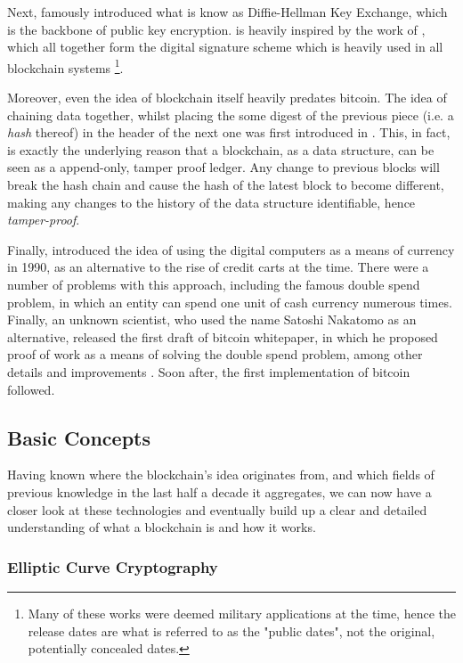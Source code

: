 Next, \cite{Diffie_Hellman_1976} famously introduced what is know as Diffie-Hellman Key Exchange,
which is the backbone of public key encryption. \cite{Diffie_Hellman_1976} is heavily inspired by
the work of \cite{Merkle_1978}, which all together form the digital signature scheme which is
heavily used in all blockchain systems \footnote{Many of these works were deemed military
applications at the time, hence the release dates are what is referred to as the "public dates", not
the original, potentially concealed dates.}.

Moreover, even the idea of blockchain itself heavily predates bitcoin. The idea of chaining data
together, whilst placing the some digest of the previous piece (i.e. a \textit{hash} thereof) in the
header of the next one was first introduced in \cite{Timestamping_1991}. This, in fact, is exactly
the underlying reason that a blockchain, as a data structure, can be seen as a append-only, tamper
proof ledger. Any change to previous blocks will break the hash chain and cause the hash of the
latest block to become different, making any changes to the history of the data structure
identifiable, hence \textit{tamper-proof}.

Finally, \cite{Chaum_Fiat_Naor_1990} introduced the idea of using the digital computers as a means
of currency in 1990, as an alternative to the rise of credit carts at the time. There were a number
of problems with this approach, including the famous double spend problem, in which an entity can
spend one unit of cash currency numerous times. Finally, an unknown scientist, who used the name
Satoshi Nakatomo as an alternative, released the first draft of bitcoin whitepaper, in which he
proposed proof of work as a means of solving the double spend problem, among other details and
improvements \cite{Nakamoto}. Soon after, the first implementation of bitcoin followed.

\subsection{Basic Concepts}

Having known where the blockchain's idea originates from, and which fields of previous knowledge in
the last half a decade it aggregates, we can now have a closer look at these technologies and
eventually build up a clear and detailed understanding of what a blockchain is and how it works.

\subsubsection{Elliptic Curve Cryptography}

